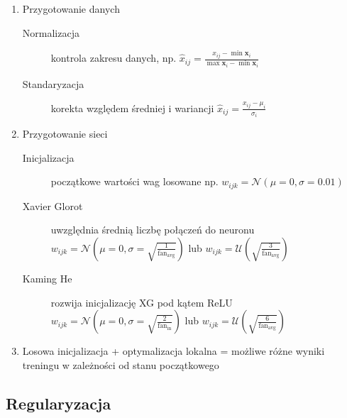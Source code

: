 \documentclass[11pt, xcolor={dvipsnames,svgnames},aspectratio=169]{beamer}
\theoremstyle{plain}
\begin{document}
\begin{frame}
	\begin{enumerate}
		\item Przygotowanie danych
			\begin{description}
				\item[Normalizacja] kontrola zakresu danych, np. $\hat{x}_{ij} = \frac{x_{ij} - \min \mathbf{x}_{i}}{\max \mathbf{x}_{i} - \min \mathbf{x}_{i}}$
				\item[Standaryzacja] korekta względem średniej i wariancji $\hat{x}_{ij} = \frac{x_{ij} - \mu_i}{\sigma_i}$
			\end{description}\pause
		\item Przygotowanie sieci
			\begin{description}
				\item[Inicjalizacja] początkowe wartości wag losowane np. $w_{ijk} = \mathcal{N}(\mu=0,\sigma=0.01)$
				\item[Xavier Glorot] uwzględnia średnią liczbę połączeń do neuronu $w_{ijk} = \mathcal{N}\left(\mu=0,\sigma=\sqrt{\frac{1}{\mathrm{fan_{avg}}}}\right)$ lub $w_{ijk} = \mathcal{U}\left(\sqrt{\frac{3}{\mathrm{fan_{avg}}}}\right)$
				\item[Kaming He] rozwija inicjalizację XG pod kątem ReLU $w_{ijk} = \mathcal{N}\left(\mu=0,\sigma=\sqrt{\frac{2}{\mathrm{fan_{in}}}}\right)$ lub $w_{ijk} = \mathcal{U}\left(\sqrt{\frac{6}{\mathrm{fan_{avg}}}}\right)$
			\end{description}\pause
		\item Losowa inicjalizacja + optymalizacja lokalna = możliwe różne wyniki treningu w zależności od stanu początkowego 		
	\end{enumerate}
\end{frame}


\subsection{Regularyzacja}
\end{document}
